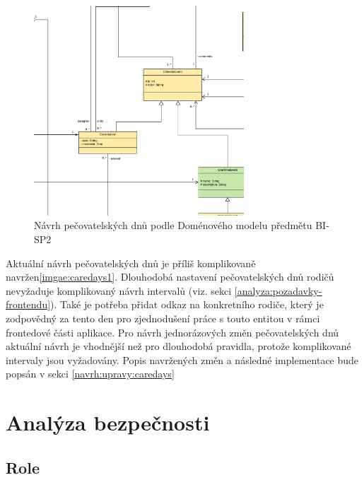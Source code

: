             \begin{figure}\centering
	            \includegraphics[width=0.7\textwidth]{pdfs/CareDays1}
	            \caption[Návrh pečovatelských dnů]{Návrh pečovatelských dnů podle Doménového modelu předmětu BI-SP2}\label{image:caredays1}
            \end{figure}
            Aktuální návrh pečovatelských dnů je příliš komplikovaně navržen\ref{imgae:caredays1}. Dlouhodobá nastavení pečovatelských dnů rodičů nevyžaduje komplikovaný návrh intervalů (viz. sekci \ref{analyza:pozadavky-frontendu}). Také je potřeba přidat odkaz na konkretního rodiče, který je zodpovědný za tento den pro zjednodušení práce s touto entitou v rámci frontedové části aplikace. Pro návrh jednorázových změn pečovatelských dnů aktuální návrh je vhodnější než pro dlouhodobá pravidla, protože komplikované intervaly jsou vyžadovány. Popis navržených změn a následné implementace bude popsán v sekci \ref{navrh:upravy:caredays}

\section{Analýza bezpečnosti}
    
    \subsection{Role}\label{analyza:bezpecnost:role}
    

